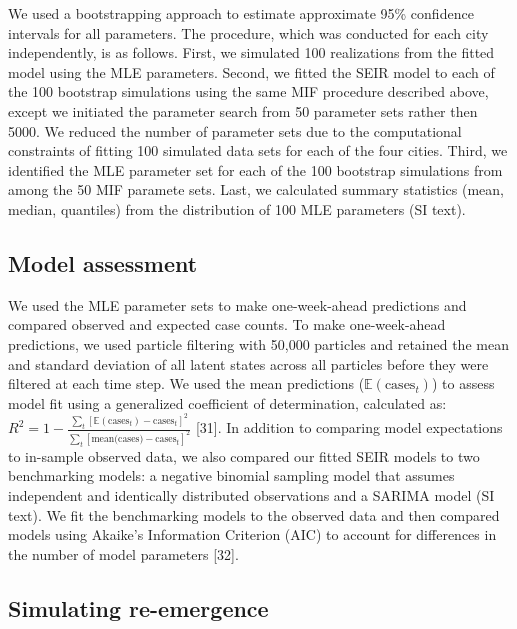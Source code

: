\documentclass[3p]{elsarticle} %
\begin{document}
We used a bootstrapping approach to estimate approximate 95\% confidence
intervals for all parameters. The procedure, which was conducted for
each city independently, is as follows. First, we simulated 100
realizations from the fitted model using the MLE parameters. Second, we
fitted the SEIR model to each of the 100 bootstrap simulations using the
same MIF procedure described above, except we initiated the parameter
search from 50 parameter sets rather then 5000. We reduced the number of
parameter sets due to the computational constraints of fitting 100
simulated data sets for each of the four cities. Third, we identified
the MLE parameter set for each of the 100 bootstrap simulations from
among the 50 MIF paramete sets. Last, we calculated summary statistics
(mean, median, quantiles) from the distribution of 100 MLE parameters
(SI text).

\hypertarget{model-assessment}{%
\subsection{Model assessment}\label{model-assessment}}

We used the MLE parameter sets to make one-week-ahead predictions and
compared observed and expected case counts. To make one-week-ahead
predictions, we used particle filtering with 50,000 particles and
retained the mean and standard deviation of all latent states across all
particles before they were filtered at each time step. We used the mean
predictions (\(\mathbb{E}(\text{cases}_t)\)) to assess model fit using a
generalized coefficient of determination, calculated as:
\(R^2 = 1 - \frac{\sum_t [\mathbb{E}(\text{cases}_t) - \text{cases}_t]^2}{\sum_t [\text{mean(cases)}-\text{cases}_t]^2}\)
{[}31{]}. In addition to comparing model expectations to in-sample
observed data, we also compared our fitted SEIR models to two
benchmarking models: a negative binomial sampling model that assumes
independent and identically distributed observations and a SARIMA model
(SI text). We fit the benchmarking models to the observed data and then
compared models using Akaike's Information Criterion (AIC) to account
for differences in the number of model parameters {[}32{]}.

\hypertarget{simulating-re-emergence}{%
\subsection{Simulating re-emergence}\label{simulating-re-emergence}}
\end{document}
